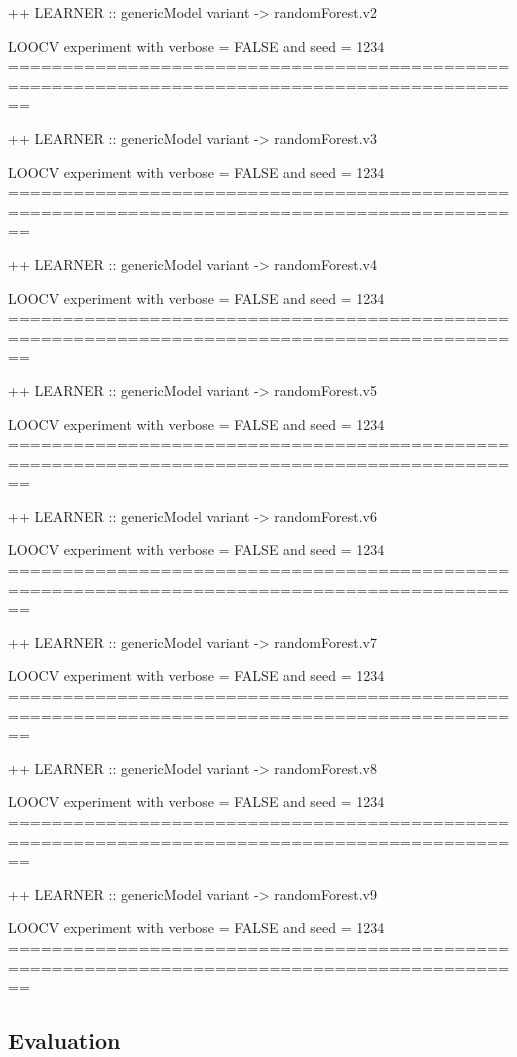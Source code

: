 \documentclass{article}
\begin{document}
\begin{Schunk}
\begin{Soutput}
++ LEARNER :: genericModel  variant ->  randomForest.v2 

 LOOCV experiment with verbose =  FALSE  and seed = 1234 
==============================================================================================

++ LEARNER :: genericModel  variant ->  randomForest.v3 

 LOOCV experiment with verbose =  FALSE  and seed = 1234 
==============================================================================================

++ LEARNER :: genericModel  variant ->  randomForest.v4 

 LOOCV experiment with verbose =  FALSE  and seed = 1234 
==============================================================================================

++ LEARNER :: genericModel  variant ->  randomForest.v5 

 LOOCV experiment with verbose =  FALSE  and seed = 1234 
==============================================================================================

++ LEARNER :: genericModel  variant ->  randomForest.v6 

 LOOCV experiment with verbose =  FALSE  and seed = 1234 
==============================================================================================

++ LEARNER :: genericModel  variant ->  randomForest.v7 

 LOOCV experiment with verbose =  FALSE  and seed = 1234 
==============================================================================================

++ LEARNER :: genericModel  variant ->  randomForest.v8 

 LOOCV experiment with verbose =  FALSE  and seed = 1234 
==============================================================================================

++ LEARNER :: genericModel  variant ->  randomForest.v9 

 LOOCV experiment with verbose =  FALSE  and seed = 1234 
==============================================================================================
\end{Soutput}
\end{Schunk}

\subsection*{Evaluation}
\end{document}
